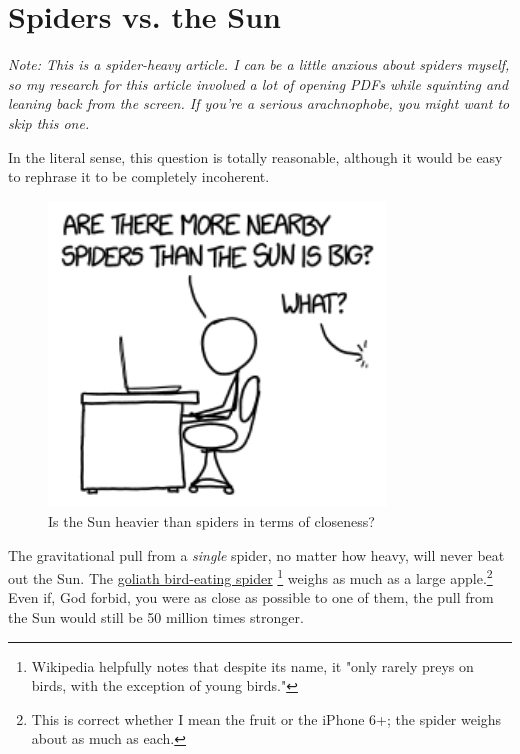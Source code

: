 {{
\chapter{Spiders vs. the Sun}
}

\hfill{}

{ \emph{Note: This is a spider-heavy article. I can be a little anxious about spiders myself, so my research for this article involved a lot of opening PDFs while squinting and leaning back from the screen. If you're a serious arachnophobe, you might want to skip this one.} }

{In the literal sense, this question is totally reasonable, although it would be easy to rephrase it to be completely incoherent.}

\begin{figure}[!htbp]
\centering
\includegraphics[scale=0.5, max width=0.8\textwidth]{imgs/a/136/question.png}
\caption{Is the Sun heavier than spiders in terms of closeness?}
\end{figure}

{The gravitational pull from a \emph{single} spider, no matter how heavy, will never beat out the Sun. The \href{https://en.wikipedia.org/wiki/Goliath\_birdeater}{goliath bird-eating spider} {\footnote{Wikipedia helpfully notes that despite its name, it "only rarely preys on birds, with the exception of young birds."} } weighs as much as a large apple.{\footnote{This is correct whether I mean the fruit or the iPhone 6+; the spider weighs about as much as each.} } Even if, God forbid, you were as close as possible to one of them, the pull from the Sun would still be 50 million times stronger.}

}
